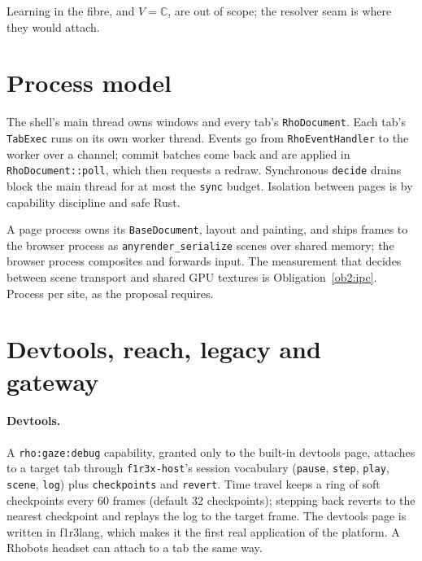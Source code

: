 \documentclass[11pt]{article}
\theoremstyle{definition}
\theoremstyle{remark}
\newcommand{\fl}{f1r3lang}
\newcommand{\code}[1]{\texttt{#1}}
\begin{document}
\noindent
Learning in the fibre, and $V=\mathbb{C}$, are out of scope; the resolver seam is
where they would attach.

\section{Process model}\label{sec:process}

\begin{description}[leftmargin=1.5em,style=nextline]
\item[P1--P3: one process, a worker per tab.] The shell's main thread owns windows
  and every tab's \code{RhoDocument}. Each tab's \code{TabExec} runs on its own
  worker thread. Events go from \code{RhoEventHandler} to the worker over a channel;
  commit batches come back and are applied in \code{RhoDocument::poll}, which then
  requests a redraw. Synchronous \code{decide} drains block the main thread for at
  most the \code{sync} budget. Isolation between pages is by capability discipline
  and safe Rust.
\item[P4: page processes.] A page process owns its \code{BaseDocument}, layout and
  painting, and ships frames to the browser process as \code{anyrender\_serialize}
  scenes over shared memory; the browser process composites and forwards input. The
  measurement that decides between scene transport and shared GPU textures is
  Obligation~\ref{ob2:ipc}. Process per site, as the proposal requires.
\end{description}

\section{Devtools, reach, legacy and gateway}\label{sec:devtools}

\paragraph{Devtools.} A \code{rho:gaze:debug} capability, granted only to the
built-in devtools page, attaches to a target tab through \code{f1r3x-host}'s session
vocabulary (\code{pause}, \code{step}, \code{play}, \code{scene}, \code{log}) plus
\code{checkpoints} and \code{revert}. Time travel keeps a ring of soft checkpoints
every 60 frames (default 32 checkpoints); stepping back reverts to the nearest
checkpoint and replays the log to the target frame. The devtools page is written in
\fl{}, which makes it the first real application of the platform. A Rhobots headset
can attach to a tab the same way.
\end{document}
